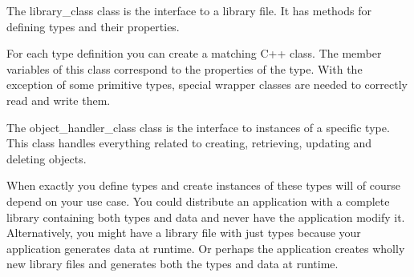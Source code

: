
The \gls{library_class} class is the interface to a library file. It has methods for defining types and their properties.

For each type definition you can create a matching C++ class. The member variables of this class correspond to the properties of the type. With the exception of some primitive types, special wrapper classes are needed to correctly read and write them.

The \gls{object_handler_class} class is the interface to instances of a specific type.  This class handles everything related to creating, retrieving, updating and deleting objects.

When exactly you define types and create instances of these types will of course depend on your use case. You could distribute an application with a complete library containing both types and data and never have the application modify it. Alternatively, you might have a library file with just types because your application generates data at runtime. Or perhaps the application creates wholly new library files and generates both the types and data at runtime.
